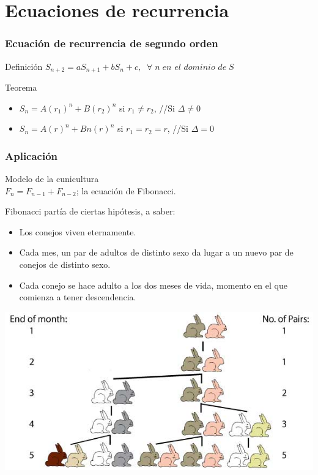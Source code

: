 \documentclass{beamer}
\begin{document}
	
\section{Ecuaciones de recurrencia}
\begin{frame}
	\frametitle{Ecuación de recurrencia de segundo orden}
	\begin{block}{Definición}
	$S_{n+2} = aS_{n+1} + bS_{n} + c, \;\; \forall\; n \; \textit{en el dominio de} \; S$
		 
	\end{block}
	\begin{block}{Teorema }
	\begin{itemize}
	    \item $S_n = A(r_1)^n + B(r_2)^n$ si $r_1 \neq r_2$, \;\;\;\;\;\;\;\;\;\;\;\;\;\;\;\;\;\; //Si $\Delta \neq 0$
	    \item $S_n = A(r)^n + Bn(r)^n$ si $r_1 = r_2 = r$, \;\;\;\;\;\;\;\;\;\;\; //Si $\Delta = 0$
	\end{itemize}
		
					
	\end{block}
\end{frame}

	
		\begin{frame}
			\frametitle{Aplicación}
		\begin{block}{Modelo de la cunicultura\\
		$F_n = F_{n-1} + F_{n-2}$;  la ecuación de Fibonacci.}
				\begin{minipage}{7cm}
			Fibonacci partía de ciertas hipótesis, a saber:
\begin{itemize}
    \item Los conejos viven eternamente.
    \item Cada mes, un par de adultos de distinto sexo da lugar a un nuevo par de conejos de distinto sexo.
    \item Cada conejo se hace adulto a los dos meses de vida, momento en el que comienza a tener descendencia.
\end{itemize}		
				\end{minipage}\hspace{0.3cm}
				\begin{minipage}{4cm}
				\includegraphics[scale=0.22]{conejos.jpg}
				\end{minipage}
				
			\end{block}
		\end{frame}	


	
\end{document}
